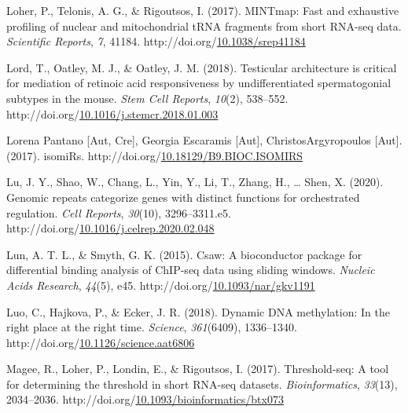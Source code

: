 \documentclass[12pt,twoside]{reedthesis}
\newlength{\cslhangindent}
\newenvironment{CSLReferences}[2] %
 {%
  \setlength{\parindent}{0pt}
  \ifodd #1 \everypar{\setlength{\hangindent}{\cslhangindent}}\ignorespaces\fi
  \ifnum #2 > 0
  \setlength{\parskip}{#2\baselineskip}
  \fi
 }%
 {}
\begin{document}
\begin{CSLReferences}{1}{0}
\leavevmode{}%
Loher, P., Telonis, A. G., \& Rigoutsos, I. (2017). MINTmap: Fast and exhaustive profiling of nuclear and mitochondrial tRNA fragments from short RNA-seq data. \emph{Scientific Reports}, \emph{7}, 41184. http://doi.org/\href{https://doi.org/10.1038/srep41184}{10.1038/srep41184}

\leavevmode{}%
Lord, T., Oatley, M. J., \& Oatley, J. M. (2018). Testicular architecture is critical for mediation of retinoic acid responsiveness by undifferentiated spermatogonial subtypes in the mouse. \emph{Stem Cell Reports}, \emph{10}(2), 538--552. http://doi.org/\href{https://doi.org/10.1016/j.stemcr.2018.01.003}{10.1016/j.stemcr.2018.01.003}

\leavevmode{}%
Lorena Pantano {[}Aut, Cre{]}, Georgia Escaramis {[}Aut{]}, ChristosArgyropoulos {[}Aut{]}. (2017). isomiRs. http://doi.org/\href{https://doi.org/10.18129/B9.BIOC.ISOMIRS}{10.18129/B9.BIOC.ISOMIRS}

\leavevmode{}%
Lu, J. Y., Shao, W., Chang, L., Yin, Y., Li, T., Zhang, H., \ldots{} Shen, X. (2020). Genomic repeats categorize genes with distinct functions for orchestrated regulation. \emph{Cell Reports}, \emph{30}(10), 3296--3311.e5. http://doi.org/\href{https://doi.org/10.1016/j.celrep.2020.02.048}{10.1016/j.celrep.2020.02.048}

\leavevmode{}%
Lun, A. T. L., \& Smyth, G. K. (2015). Csaw: A bioconductor package for differential binding analysis of ChIP-seq data using sliding windows. \emph{Nucleic Acids Research}, \emph{44}(5), e45. http://doi.org/\href{https://doi.org/10.1093/nar/gkv1191}{10.1093/nar/gkv1191}

\leavevmode{}%
Luo, C., Hajkova, P., \& Ecker, J. R. (2018). Dynamic DNA methylation: In the right place at the right time. \emph{Science}, \emph{361}(6409), 1336--1340. http://doi.org/\href{https://doi.org/10.1126/science.aat6806}{10.1126/science.aat6806}

\leavevmode{}%
Magee, R., Loher, P., Londin, E., \& Rigoutsos, I. (2017). Threshold-seq: A tool for determining the threshold in short RNA-seq datasets. \emph{Bioinformatics}, \emph{33}(13), 2034--2036. http://doi.org/\href{https://doi.org/10.1093/bioinformatics/btx073}{10.1093/bioinformatics/btx073}


\end{CSLReferences}
\end{document}
